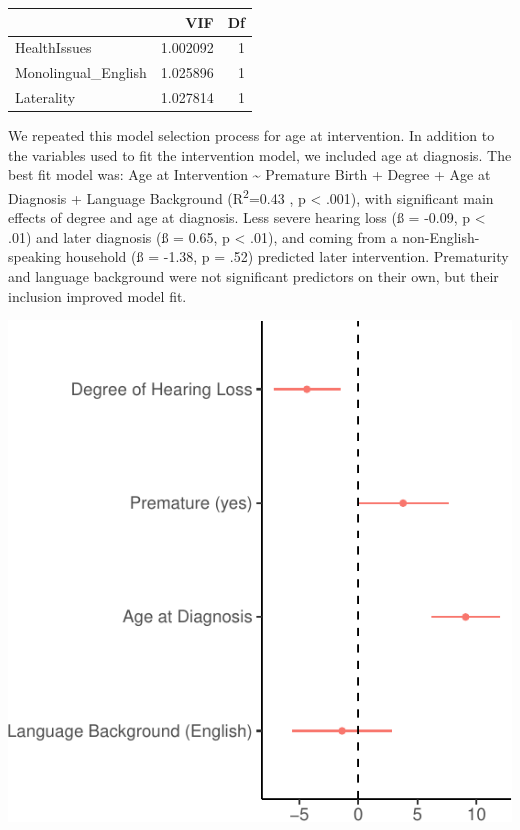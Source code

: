 \documentclass[
  english,
  man]{apa6}
\begin{document}
\begin{table}[H]
\centering
\begin{tabular}{l|r|r}
\hline
  & VIF & Df\\
\hline
HealthIssues & 1.002092 & 1\\
\hline
Monolingual\_English & 1.025896 & 1\\
\hline
Laterality & 1.027814 & 1\\
\hline
\end{tabular}
\end{table}

We repeated this model selection process for age at intervention. In addition to the variables used to fit the intervention model, we included age at diagnosis. The best fit model was: Age at Intervention \textasciitilde{} Premature Birth + Degree + Age at Diagnosis + Language Background (R\textsuperscript{2}=0.43 , p \textless{} .001), with significant main effects of degree and age at diagnosis. Less severe hearing loss (ß = -0.09, p \textless{} .01) and later diagnosis (ß = 0.65, p \textless{} .01), and coming from a non-English-speaking household (ß = -1.38, p = .52) predicted later intervention. Prematurity and language background were not significant predictors on their own, but their inclusion improved model fit.

\includegraphics{ELSSP_paper_files/figure-latex/intervention-betas-1.pdf}
\end{document}
